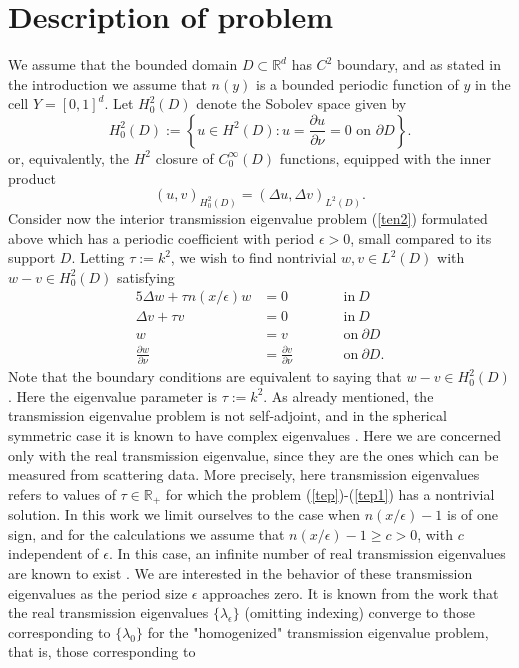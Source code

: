 \documentclass[10pt,a4paper]{amsart}
\begin{document}
\section{Description of problem}
We assume that the  bounded domain $D \subset \mathbb{R}^d$ has  $C^2$ boundary, and  as stated in the introduction we assume that  $n(y)$ is a bounded  periodic function of $y$ in the cell $Y= [0,1]^d $.  Let $H^2_0(D)$ denote the Sobolev space given by
$$H^2_0(D) := \left \{  u\in H^2(D) : u=\frac{\partial u}{\partial \nu}=0\text{ on $\partial D$} \right \}.$$ 
or, equivalently, the $H^2$ closure of $C^\infty_0(D)$ functions, equipped with the inner product 
$$ (u,v)_{H^2_0(D)} = (\Delta u , \Delta v)_{L^2(D)}.$$
Consider now the interior transmission eigenvalue problem (\ref{ten2}) formulated above  which has a periodic coefficient with period $\epsilon>0$, small compared to its support $D$.  Letting $\tau:=k^2$, we wish to find nontrivial  $w, v\in L^2(D)$ with $w-v\in H^2_0(D)$ satisfying  
\begin{alignat}{5}\label{tep}
\Delta w+\tau n(x/\epsilon) w &= 0 &\qquad & \mathrm{in} \ D \\
\Delta v+\tau v& =0 & &  \mathrm{in}\  D \\
w&= v  & &\mathrm{on} \ \partial D \\
\displaystyle \frac{\partial w}{\partial \nu}&=\displaystyle \frac{\partial v}{\partial \nu} & & \mathrm{on}\  \partial D.\label{tep1} 
\end{alignat}
Note that the boundary conditions are equivalent to saying that $w-v \in H^2_0(D)$. Here the eigenvalue parameter is $\tau:=k^2$. As already mentioned, the transmission eigenvalue problem is not self-adjoint, and in the spherical symmetric case it is known to have complex eigenvalues \cite[Chapter 6]{CCH-book}. Here we are concerned only with the real transmission eigenvalue, since they are the ones which can be measured from scattering data.  More precisely, here transmission eigenvalues refers to values of $\tau\in{\mathbb R}_+$ for which the problem (\ref{tep})-(\ref{tep1}) has a nontrivial solution.
In this work we limit ourselves to the case when $n(x/\epsilon)-1$ is of one sign, and for the calculations we assume that $n(x/\epsilon) -1 \geq c >0 $, with $c$ independent of $\epsilon$. In this case, an infinite number of real transmission eigenvalues are known to exist \cite{CaGiHa}. We are interested in the behavior of these transmission eigenvalues as the period size $\epsilon$ approaches zero. It is known from the work \cite{CaHaHa} that the real transmission eigenvalues $\{ \lambda_\epsilon \} $ (omitting indexing) converge to those corresponding to $\{\lambda_0\}$  for the "homogenized" transmission eigenvalue problem, that is, those corresponding to 
\end{document}

